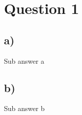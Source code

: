 \documentclass[11pt]{article}
\begin{document}
\section*{Question 1}
\subsection*{a)} Sub answer a
\subsection*{b)} Sub answer b
\end{document}
